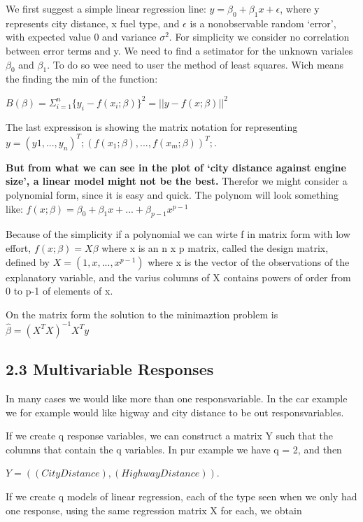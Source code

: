 \documentclass[]{article}
\begin{document}
We first suggest a simple linear regression line:
\(y = \beta_{0} + \beta_{1} x + \epsilon\), where y represents city
distance, x fuel type, and \(\epsilon\) is a nonobservable random
`error', with expected value 0 and variance \(\sigma^2\). For simplicity
we consider no correlation between error terms and y. We need to find a
setimator for the unknown variales \(\beta_{0}\) and \(\beta_{1}\). To
do so wee need to user the method of least squares. Wich means the
finding the min of the function:

\center \(B(\beta)=\Sigma_{i=1}^n \{y_{i} -f(x_{i};\beta) \}^2 = ||y-f(x;\beta)||^2\)
\center

The last expressison is showing the matrix notation for representing
\(y = (y1,...,y_{n})^T; (f(x_{1};\beta),...,f(x_{m};\beta))^T;\).

\textbf{But from what we can see in the plot of `city distance against
engine size', a linear model might not be the best.} Therefor we might
consider a polynomial form, since it is easy and quick. The polynom will
look something like:
\center \(f(x;\beta) = \beta_{0} + \beta_{1} x + ... + \beta_{p-1} x^{p-1}\)
\center

Because of the simplicity if a polynomial we can wirte f in matrix form
with low effort, \center \(f(x;\beta)= X\beta\) \center
where x is an n x p matrix, called the design matrix, defined by
\cnter \(X=(1,x,...,x^{p-1})\) \center
where x is the vector of the observations of the explanatory variable,
and the varius columns of X contains powers of order from 0 to p-1 of
elements of x.

On the matrix form the solution to the minimaztion problem is
\center \(\hat{\beta} = (X^{T}X)^{-1}X^{T}y\)

\subsection{2.3 Multivariable Responses}\label{multivariable-responses}

In many cases we would like more than one responsvariable. In the car
example we for example would like higway and city distance to be out
responsvariables.

If we create q response variables, we can construct a matrix Y such that
the columns that contain the q variables. In pur example we have q = 2,
and then

\center \(Y = ((CityDistance), (HighwayDistance))\). \center

If we create q models of linear regression, each of the type seen when
we only had one response, using the same regression matrix X for each,
we obtain
\end{document}
